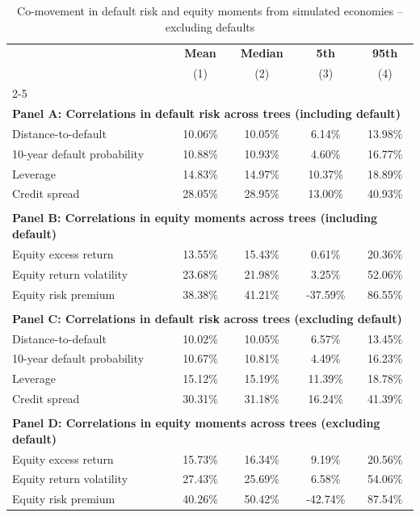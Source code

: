 \begin{table}[h]
\small
\centering
\caption{Co-movement in default risk and equity moments from simulated economies -- excluding defaults}
\label{tab:table_simulation_no_default}
\begin{tabular*}{\textwidth}{@{\extracolsep{\fill}}lcccc}
\toprule
& \textbf{Mean} & \textbf{Median} & \textbf{5th} & \textbf{95th} \\
\addlinespace
& (1) & (2) & (3) & (4) \\
\cmidrule{2-5}
\\
\multicolumn{5}{l}{\textbf{Panel A: Correlations in default risk across trees (including default)}} \\
\midrule
\multicolumn{1}{l}{Distance-to-default} & 10.06\% & 10.05\% & 6.14\% & 13.98\% \\
\multicolumn{1}{l}{10-year default probability} & 10.88\% & 10.93\% & 4.60\% & 16.77\% \\
\multicolumn{1}{l}{Leverage} & 14.83\% & 14.97\% & 10.37\% & 18.89\% \\
\multicolumn{1}{l}{Credit spread} & 28.05\% & 28.95\% & 13.00\% & 40.93\% \\
\\
\multicolumn{5}{l}{\textbf{Panel B: Correlations in equity moments across trees (including default)}} \\
\midrule
\multicolumn{1}{l}{Equity excess return} & 13.55\% & 15.43\% & 0.61\% & 20.36\% \\
\multicolumn{1}{l}{Equity return volatility} & 23.68\% & 21.98\% & 3.25\% & 52.06\% \\
\multicolumn{1}{l}{Equity risk premium} & 38.38\% & 41.21\% & -37.59\% & 86.55\% \\
\\
\multicolumn{5}{l}{\textbf{Panel C: Correlations in default risk across trees (excluding default)}} \\
\midrule
\multicolumn{1}{l}{Distance-to-default} & 10.02\% & 10.05\% & 6.57\% & 13.45\% \\
\multicolumn{1}{l}{10-year default probability} & 10.67\% & 10.81\% & 4.49\% & 16.23\% \\
\multicolumn{1}{l}{Leverage} & 15.12\% & 15.19\% & 11.39\% & 18.78\% \\
\multicolumn{1}{l}{Credit spread} & 30.31\% & 31.18\% & 16.24\% & 41.39\% \\
\\
\multicolumn{5}{l}{\textbf{Panel D: Correlations in equity moments across trees (excluding default)}} \\
\midrule
\multicolumn{1}{l}{Equity excess return} & 15.73\% & 16.34\% & 9.19\% & 20.56\% \\
\multicolumn{1}{l}{Equity return volatility} & 27.43\% & 25.69\% & 6.58\% & 54.06\% \\
\multicolumn{1}{l}{Equity risk premium} & 40.26\% & 50.42\% & -42.74\% & 87.54\% \\
\bottomrule
\end{tabular*}
\end{table}
